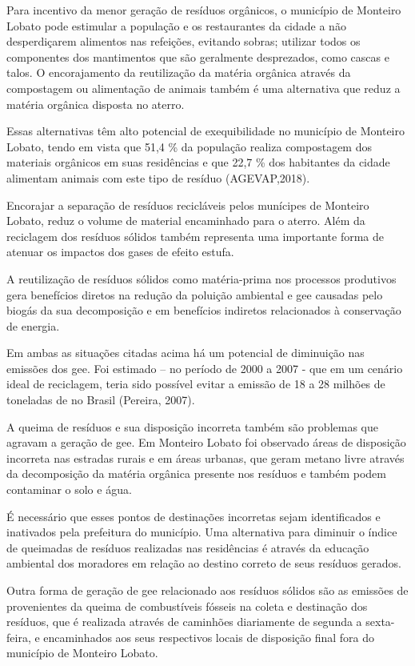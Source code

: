 Para incentivo da menor geração de resíduos orgânicos, o município de Monteiro Lobato pode estimular a população e os restaurantes da cidade a não desperdiçarem alimentos nas refeições, evitando sobras; utilizar todos os componentes dos mantimentos que são geralmente desprezados, como cascas e talos. O encorajamento da reutilização da matéria orgânica através da compostagem ou alimentação de animais também é uma alternativa que reduz a matéria orgânica disposta no aterro.
 
Essas alternativas têm alto potencial de exequibilidade no município de Monteiro Lobato, tendo em vista que 51,4 \% da população realiza compostagem dos materiais orgânicos em suas residências e que 22,7 \% dos habitantes da cidade alimentam animais com este tipo de resíduo (AGEVAP,2018).

Encorajar a separação de resíduos recicláveis pelos munícipes de Monteiro Lobato, reduz o volume de material encaminhado para o aterro. Além da reciclagem dos resíduos sólidos também representa uma importante forma de atenuar os impactos dos gases de efeito estufa. 

A reutilização de resíduos sólidos como matéria-prima nos processos produtivos gera benefícios diretos na redução da poluição ambiental e \gls{gee} causadas pelo biogás da sua decomposição e em benefícios indiretos relacionados à conservação de energia. 

Em ambas as situações citadas acima há um potencial de diminuição nas emissões dos \gls{gee}. Foi estimado – no período de 2000 a 2007 - que em um cenário ideal de reciclagem, teria sido possível evitar a emissão de 18 a 28 milhões de toneladas de  no Brasil (Pereira, 2007). 

A queima de resíduos e sua disposição incorreta também são problemas que agravam a geração de \gls{gee}. Em Monteiro Lobato foi observado áreas de disposição incorreta nas estradas rurais e em áreas urbanas, que geram metano livre através da decomposição da matéria orgânica presente nos resíduos e também podem contaminar o solo e água. 

É necessário que esses pontos de destinações incorretas sejam identificados e inativados pela prefeitura do município. Uma alternativa para diminuir o índice de queimadas de resíduos realizadas nas residências é através da educação ambiental dos moradores em relação ao destino correto de seus resíduos gerados.  

Outra forma de geração de \gls{gee} relacionado aos resíduos sólidos são as emissões de  provenientes da queima de combustíveis fósseis na coleta e destinação dos resíduos, que é realizada através de caminhões diariamente de segunda a sexta-feira, e encaminhados aos seus respectivos locais de disposição final fora do município de Monteiro Lobato. 

